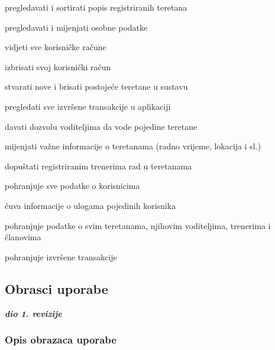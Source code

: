 \begin{packed_enum}
\begin{packed_enum}
				\item pregledavati i sortirati popis registriranih teretana
				\item pregledavati i mijenjati osobne podatke
				\item vidjeti sve korisničke račune
				\item izbrisati svoj korisnički račun
				\item stvarati nove i brisati postojeće teretane u sustavu
				\item pregledati sve izvršene transakcije u aplikaciji
				\item davati dozvolu  voditeljima da vode pojedine teretane
				\item mijenjati važne informacije o teretanama (radno vrijeme, lokacija i sl.)
				\item dopuštati registriranim trenerima rad u teretanama
				
			\end{packed_enum}
			
			
			\item  {}
			
			\begin{packed_enum}
				
				\item pohranjuje sve podatke o korisnicima
				\item čuva informacije o ulogama pojedinih korisnika
				\item pohranjuje podatke o svim teretanama, njihovim voditeljima, trenerima i članovima
				\item pohranjuje izvršene transakcije
				
			\end{packed_enum}
			
		\end{packed_enum}
		
		\eject
				
			\subsection{Obrasci uporabe}
				
				\textbf{\textit{dio 1. revizije}}
				
				\subsubsection{Opis obrazaca uporabe}


